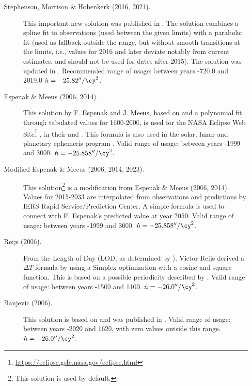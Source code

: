 \begin{description}
\item[Stephenson, Morrison \& Hohenkerk (2016, 2021).] This important new solution was published 
  in . 
  The solution combines a spline fit to observations (used between the given limits) 
  with a parabolic fit (used as fallback outside the range, but without smooth transitions at the limits, i.e., 
  values for 2016 and later deviate notably from current estimates, and should not be used for dates after 2015).
  The solution was updated in .
  Recommended range of usage: between years -720.0 and 2019.0 $\dot{n}=-25.82''/\cy^2$.
  
\item[Espenak \& Meeus (2006, 2014).] This solution by F. Espenak and J. Meeus, based on 
	\citet{2004JHA....35..327M} and a polynomial fit
  through tabulated values for 1600-2000, is used for the NASA Eclipse
  Web Site\footnote{\url{https://eclipse.gsfc.nasa.gov/eclipse.html}}
  , in their  and . This formula is also used in the
  solar, lunar and planetary ephemeris program . Valid
  range of usage: between years -1999 and
  3000. $\dot{n}=-25.858''/\cy^2$.

\item[Modified Espenak \& Meeus (2006, 2014, 2023).] This solution\footnote{This solution
  is used by default.} is a modification from Espenak \& Meeus (2006, 2014). Values for 2015-2033 are
  interpolated from observations and predictions by IERS Rapid Service/Prediction Center. A simple formula is
  used to connect with F. Espenak's predicted value at year 2050.
  Valid range of usage: between years -1999 and 3000. $\dot{n}=-25.858''/\cy^2$.

\item[Reijs (2006).] From the Length of Day (LOD; as determined by
  \citet{2004JHA....35..327M}), Victor Reijs
  derived a $\Delta T$ formula by using a Simplex optimization with a
  cosine and square
  function.
  This is based on a possible periodicity described by
  \citet{2004JHA....35..327M}. Valid range of usage: between
  years -1500 and 1100. $\dot{n}=-26.0''/\cy^2$.

\item[Banjevic (2006).] This solution is based on
  \citet{1984RSPTA.313...47S} and was
  published in . Valid range of usage: between
  years -2020 and 1620, with zero values outside this range. 
  $\dot{n}=-26.0''/\cy^2$.


\end{description}
